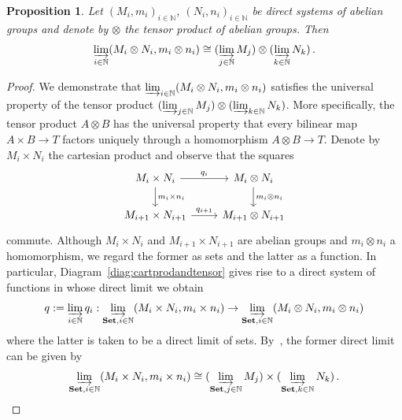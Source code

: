\documentclass[12pt, a4paper]{article}
\numberwithin{equation}{section}
\newtheorem{prop}[thm]{Proposition}
\theoremstyle{empty}
\theoremstyle{nonumberplain}
\newtheorem{proof}{Proof}
\begin{document}
\begin{prop}\label{prop:dirlimcommswithtensor}
Let $(M_i, m_i)_{i \in \mathbb{N}}$, $(N_i, n_i)_{i \in \mathbb{N}}$ be direct systems of abelian groups and denote by $\otimes$ the tensor product of abelian groups. Then
\[ \varinjlim_{i \in \mathbb{N}} (M_i \otimes N_i, m_i \otimes n_i) \cong (\varinjlim_{j \in \mathbb{N}} M_j) \otimes (\varinjlim_{k \in \mathbb{N}} N_k) \, . \]
\end{prop}

\begin{proof}
We demonstrate that $\varinjlim_{i \in \mathbb{N}} (M_i \otimes N_i, m_i \otimes n_i)$ satisfies the universal property of the tensor product $(\varinjlim_{j \in \mathbb{N}} M_j) \otimes (\varinjlim_{k \in \mathbb{N}} N_k)$. More specifically, the tensor product $A \otimes B$ has the universal property that every bilinear map $A \times B \rightarrow T$ factors uniquely through a homomorphism $A \otimes B \rightarrow T$. Denote by $M_i \times N_i$ the cartesian product and observe that the squares
\begin{equation}\label{diag:cartprodandtensor}
\begin{tikzcd}
    M_i \times N_i \arrow[r, "q_i"] \arrow[d, "m_i \times n_i"] & M_i \otimes N_i \arrow[d, "m_i \otimes n_i"] \\
    M_{i+1} \times N_{i+1} \arrow[r, "q_{i+1}"] & M_{i+1} \otimes N_{i+1}
\end{tikzcd}
\end{equation}
commute. Although $M_i \times N_i$ and $M_{i+1} \times N_{i+1}$ are abelian groups and $m_i \otimes n_i$ a homomorphism, we regard the former as sets and the latter as a function. In particular, Diagram~\ref{diag:cartprodandtensor} gives rise to a direct system of functions in whose direct limit we obtain
\begin{equation}\label{eq:cartprodandtensor}
q := \varinjlim_{i \in \mathbb{N}} q_i: \varinjlim_{\mathbf{Set}, i \in \mathbb{N}} (M_i \times N_i, m_i \times n_i) \rightarrow \varinjlim_{\mathbf{Set}, i \in \mathbb{N}} (M_i \otimes N_i, m_i \otimes n_i)
\end{equation}
where the latter is taken to be a direct limit of sets. By~\cite[\href{https://stacks.math.columbia.edu/tag/002W}{Tag 002W}]{stacks-project}, the former direct limit can be given by
\begin{equation}\label{eq:swapdirlimitwithprod}
\varinjlim_{\mathbf{Set}, i \in \mathbb{N}} (M_i \times N_i, m_i \times n_i) \cong (\varinjlim_{\mathbf{Set}, j \in \mathbb{N}} M_j) \times (\varinjlim_{\mathbf{Set}, k \in \mathbb{N}} N_k) \, .

\end{equation}
\end{proof}
\end{document}
